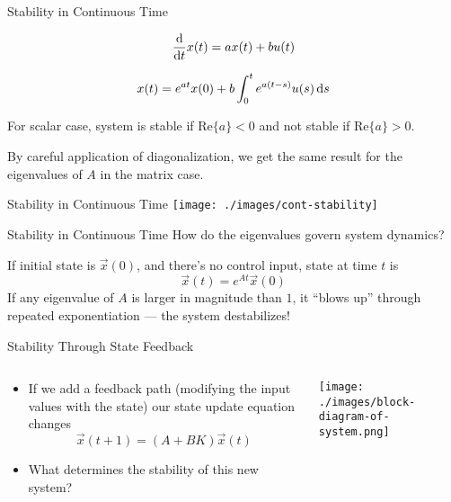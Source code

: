 \begin{frame}{Stability in Continuous Time}

    \[
        \ddt{} x(t) = a x(t) + b u(t)
    \]

    \[
        x(t) = e^{at} x(0) + b \int_0^t e^{a(t - s)} u(s) \,\differential s
    \]

    For scalar case, system is stable if \(\mathrm{Re}\{a\} < 0\) and not stable if \(\mathrm{Re}\{a\} > 0\).

    By careful application of diagonalization, we get the same result for the eigenvalues of \(A\) in the matrix case.

\end{frame}

\begin{frame}{Stability in Continuous Time}
    \texttt{[image: ./images/cont-stability]}
\end{frame}

\begin{frame}{Stability in Continuous Time}
How do the eigenvalues govern system dynamics?

    If initial state is \(\vec x(0)\), and there's no control input, state at time \(t\) is
    \[
        \vec x(t) = e^{At} \vec x(0)
    \]
    If any eigenvalue of \(A\) is larger in magnitude than \(1\), it ``blows up'' through repeated exponentiation --- the system destabilizes!
\end{frame}


\begin{frame}{Stability Through State Feedback}

\begin{columns}[T] %
\begin{column}{.48\textwidth}
%
    \begin{itemize}
        \item If we add a feedback path (modifying the input values with the state) our state update equation changes \[ \vec x(t + 1) = (A + BK) \vec x(t)\]
        \item What determines the stability of this new system?
    \end{itemize}

\end{column}%
\hfill%
\begin{column}{.48\textwidth}
    \texttt{[image: ./images/block-diagram-of-system.png]}

\end{column}%
\end{columns}

\end{frame}

